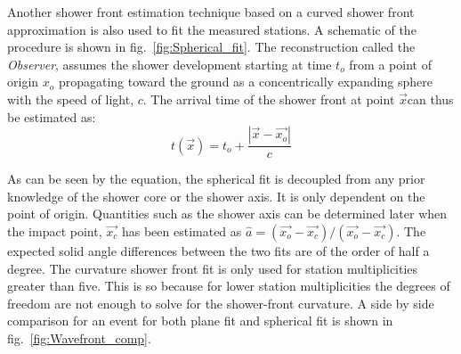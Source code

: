 Another shower front estimation technique based on a curved shower front approximation is also used to fit the measured stations. A schematic of the procedure is shown in fig.~\ref{fig:Spherical_fit}. The reconstruction called the \textit{Observer}, assumes the shower development starting at time $t_o$ from a point of origin $x_o$ propagating toward the ground as a concentrically expanding sphere with the speed of light, $c$. The arrival time of the shower front at point $\vec{x}$can thus be estimated as:
\begin{equation}
  t(\vec{x}) = t_o + \frac{|\vec{x}-\vec{x_o}|}{c}
\end{equation}

As can be seen by the equation, the spherical fit is decoupled from any prior knowledge of the shower core or the shower axis. It is only dependent on the point of origin. Quantities such as the shower axis can be determined later when the impact point, $\vec{x_c}$ has been estimated as $ \hat{a} = (\vec{x_o} -\vec{x_c})/ (\vec{x_o}-\vec{x_c})$. The expected solid angle differences between the two fits are of the order of half a degree. The curvature shower front fit is only used for station multiplicities greater than five. This is so because for lower station multiplicities the degrees of freedom are not enough to solve for the shower-front curvature. A side by side comparison for an event for both plane fit and spherical fit is shown in fig.~\ref{fig:Wavefront_comp}.

